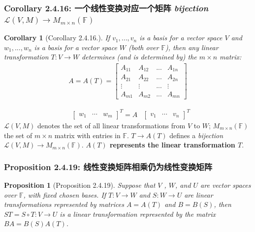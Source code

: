 \documentclass[11pt,a4paper]{article}
\newtheorem{proposition}{Proposition}
\newtheorem{corollary}{Corollary}
\begin{document}
\subsubsection{Corollary 2.4.16: 一个线性变换对应一个矩阵 \textit{bijection} $\mathcal{L} (V,M)\rightarrow M_{m\times n}(\mathbb{F})$}
\begin{corollary}[Corollary 2.4.16.]
    If $v_1,...,v_n$ is a basis for a vector space $V$ and $w_1,...,w_n$ is a basis for a vector space $W$ (both over $\mathbb{F}$), then any linear transformation $T : V \rightarrow W$ determines (and is determined by) the $m\times n$ matrix:
    \begin{equation}
        \begin{aligned}
            A=A(T)=\begin{bmatrix}
                A_{11}&	A_{12}&... &A_{1n}\\
                A_{21}&	A_{22}&... &A_{2n}\\
                \vdots&	\vdots&... &\vdots\\
                A_{m1}&	A_{m2}&... &A_{mn}
            \end{bmatrix}
        \end{aligned}
        \nonumber
    \end{equation}
\end{corollary}
\begin{equation}
    \begin{aligned}
        &\begin{bmatrix}
            w_1&\cdots	&w_m
        \end{bmatrix}^T=A
        &\begin{bmatrix}
                v_1&\cdots	&v_n
        \end{bmatrix}^T
    \end{aligned}
    \nonumber
\end{equation}
$\mathcal{L} (V,M)$ denotes the set of all linear transformations from $V$ to $W$; $M_{m\times n}(\mathbb{F})$ the set of $m\times n$ matrix with entries in $\mathbb{F}$. $T\rightarrow A(T)$ defines a \textit{bijection} $\mathcal{L} (V,M)\rightarrow M_{m\times n}(\mathbb{F})$. \textbf{$A(T)$ represents the linear transformation $T$}.

\subsubsection{Proposition 2.4.19: 线性变换矩阵相乘仍为线性变换矩阵}
\begin{proposition}[Proposition 2.4.19]
    Suppose that $V$ , $W$, and $U$ are vector spaces over $\mathbb{F}$, with fixed chosen bases. If
    $T : V \rightarrow W$ and $S : W \rightarrow U$ are linear transformations represented by matrices $A = A(T)$ and $B = B(S)$,
    then $ST = S \circ T : V \rightarrow U$ is a linear transformation represented by the matrix $BA = B(S)A(T)$.
\end{proposition}
\end{document}
